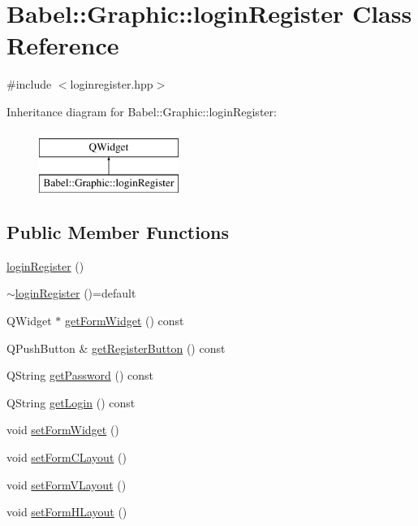 \hypertarget{classBabel_1_1Graphic_1_1loginRegister}{}\section{Babel\+:\+:Graphic\+:\+:login\+Register Class Reference}
\label{classBabel_1_1Graphic_1_1loginRegister}


{\ttfamily \#include $<$loginregister.\+hpp$>$}

Inheritance diagram for Babel\+:\+:Graphic\+:\+:login\+Register\+:\begin{figure}[H]
\begin{center}
\leavevmode
\includegraphics[height=2.000000cm]{classBabel_1_1Graphic_1_1loginRegister}
\end{center}
\end{figure}
\subsection*{Public Member Functions}
\begin{DoxyCompactItemize}
\item 
\hyperlink{classBabel_1_1Graphic_1_1loginRegister_a0ccfab4e1a8118bc5c36a48bb2636366}{login\+Register} ()
\item 
\hyperlink{classBabel_1_1Graphic_1_1loginRegister_a394080fb3916c996a1df14d0d0ad994c}{$\sim$login\+Register} ()=default
\item 
Q\+Widget $\ast$ \hyperlink{classBabel_1_1Graphic_1_1loginRegister_af9428cc8cf24868d2a41f25d51fa2fae}{get\+Form\+Widget} () const
\item 
Q\+Push\+Button \& \hyperlink{classBabel_1_1Graphic_1_1loginRegister_a70f2da9720060091e49efcbdb1144c8f}{get\+Register\+Button} () const
\item 
Q\+String \hyperlink{classBabel_1_1Graphic_1_1loginRegister_ac7c9aa3796da325676beb649139c57ad}{get\+Password} () const
\item 
Q\+String \hyperlink{classBabel_1_1Graphic_1_1loginRegister_a278b0a1b27fd0c5641365a2041e5b9a8}{get\+Login} () const
\item 
void \hyperlink{classBabel_1_1Graphic_1_1loginRegister_af19fba33f4909f44f7f1aad884d8ba22}{set\+Form\+Widget} ()
\item 
void \hyperlink{classBabel_1_1Graphic_1_1loginRegister_a72c652b996358c0aabd97feb3abbf485}{set\+Form\+C\+Layout} ()
\item 
void \hyperlink{classBabel_1_1Graphic_1_1loginRegister_abf1f55f98be322d5fb3e0748e641b126}{set\+Form\+V\+Layout} ()
\item 
void \hyperlink{classBabel_1_1Graphic_1_1loginRegister_a7b887978cfa8c030b1965ab3043ec83b}{set\+Form\+H\+Layout} ()
\end{DoxyCompactItemize}



